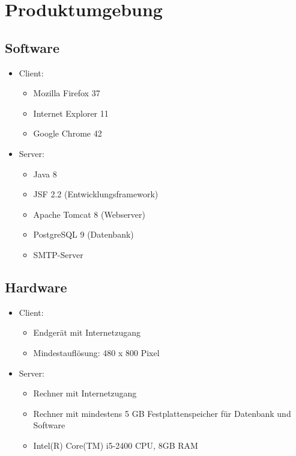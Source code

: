 \documentclass[a4paper]{scrreprt}
\begin{document}
			
 
\chapter{Produktumgebung}
	\section{Software}
        \begin{itemize}
      		\item Client:
	      		\begin{itemize}
	      			\item Mozilla Firefox 37
	      			\item Internet Explorer 11
	      			\item Google Chrome 42
	      		\end{itemize}
          	\item Server:
	            \begin{itemize}
	            	\item Java 8
	            	\item JSF 2.2 (Entwicklungsframework)
	            	\item Apache Tomcat 8 (Webserver)
	            	\item PostgreSQL 9 (Datenbank)
	            	\item SMTP-Server
	            \end{itemize}
        \end{itemize}
        
    \section{Hardware}   
        \begin{itemize}
          	\item Client:
	            \begin{itemize}
	            	\item Endgerät mit Internetzugang
	            	\item Mindestauflösung: 480 x 800 Pixel
	            \end{itemize}
          	\item Server:
	           \begin{itemize}
	           	\item Rechner mit Internetzugang
	           	\item Rechner mit mindestens 5 GB Festplattenspeicher für Datenbank und Software
	           	\item Intel(R) Core(TM) i5-2400 CPU, 8GB RAM 
	           \end{itemize}
        \end{itemize}
\end{document}
